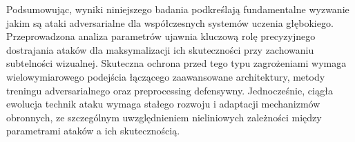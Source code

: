 \documentclass[12pt]{article}
\begin{document}
Podsumowując, wyniki niniejszego badania podkreślają fundamentalne wyzwanie jakim są ataki adversarialne dla współczesnych systemów uczenia głębokiego. Przeprowadzona analiza parametrów ujawnia kluczową rolę precyzyjnego dostrajania ataków dla maksymalizacji ich skuteczności przy zachowaniu subtelności wizualnej. Skuteczna ochrona przed tego typu zagrożeniami wymaga wielowymiarowego podejścia łączącego zaawansowane architektury, metody treningu adversarialnego oraz preprocessing defensywny. Jednocześnie, ciągła ewolucja technik ataku wymaga stałego rozwoju i adaptacji mechanizmów obronnych, ze szczególnym uwzględnieniem nieliniowych zależności między parametrami ataków a ich skutecznością.

\printbibliography
\end{document}
